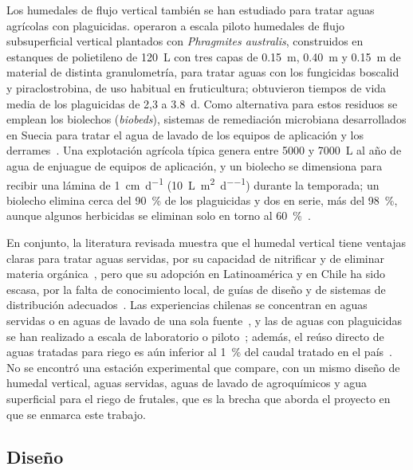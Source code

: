 Los humedales de flujo vertical también se han estudiado para tratar aguas agrícolas con plaguicidas.
\textcite{ignatowicz2023treatment} operaron a escala piloto humedales de flujo subsuperficial vertical plantados con \textit{Phragmites australis}, construidos en estanques de polietileno de \qty{120}{\liter} con tres capas de \qty{0.15}{\meter}, \qty{0.40}{\meter} y \qty{0.15}{\meter} de material de distinta granulometría, para tratar aguas con los fungicidas boscalid y piraclostrobina, de uso habitual en fruticultura; obtuvieron tiempos de vida media de los plaguicidas de 2,3 a \qty{3.8}{\day}.
Como alternativa para estos residuos se emplean los biolechos (\textit{biobeds}), sistemas de remediación microbiana desarrollados en Suecia para tratar el agua de lavado de los equipos de aplicación y los derrames~\parencite{mussali2023biobeds}.
Una explotación agrícola típica genera entre 5000 y \qty{7000}{\liter} al año de agua de enjuague de equipos de aplicación, y un biolecho se dimensiona para recibir una lámina de \qty{1}{\centi\meter\per\day} (\qty{10}{\liter\per\square\meter\per\day}) durante la temporada; un biolecho elimina cerca del \qty{90}{\percent} de los plaguicidas y dos en serie, más del \qty{98}{\percent}, aunque algunos herbicidas se eliminan solo en torno al \qty{60}{\percent}~\parencite{braul2018robust}.


En conjunto, la literatura revisada muestra que el humedal vertical tiene ventajas claras para tratar aguas servidas, por su capacidad de nitrificar y de eliminar materia orgánica~\parencite{dotro2021humedales,rodriguezdominguez2020constructed}, pero que su adopción en Latinoamérica y en Chile ha sido escasa, por la falta de conocimiento local, de guías de diseño y de sistemas de distribución adecuados~\parencite{rodriguezdominguez2020constructed,altafin2020innovaciones}.
Las experiencias chilenas se concentran en aguas servidas o en aguas de lavado de una sola fuente~\parencite{vidal2023desarrollo,vera2025atrapaniebla,vera2025nichos}, y las de aguas con plaguicidas se han realizado a escala de laboratorio o piloto~\parencite{ignatowicz2023treatment}; además, el reúso directo de aguas tratadas para riego es aún inferior al \qty{1}{\percent} del caudal tratado en el país~\parencite{verapuerto2022reclamation}.
No se encontró una estación experimental que compare, con un mismo diseño de humedal vertical, aguas servidas, aguas de lavado de agroquímicos y agua superficial para el riego de frutales, que es la brecha que aborda el proyecto en que se enmarca este trabajo.
\subsection{Diseño}

